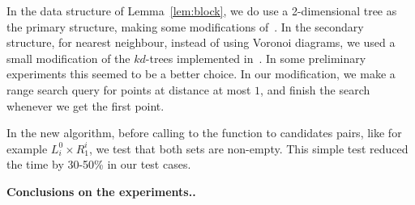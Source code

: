 \documentclass[a4paper,USenglish]{lipics}
\def\myparagraph#1{\medskip\noindent\textbf{#1.}}
\begin{document}
In the data structure of Lemma~\ref{lem:block},
we do use a 2-dimensional tree as the primary structure, making some modifications
of~\cite{cgal:n-rstd-15a}. In the secondary structure, for nearest neighbour, 
instead of using Voronoi diagrams, we used a small modification of
the $kd$-trees implemented in~\cite{cgal:tf-ssd-15a}. 
In some preliminary experiments this seemed to be a better choice.
In our modification, we make a range search query for points at distance at most $1$,
and finish the search whenever we get the first point.

In the new algorithm, before calling to the function to candidates pairs, like for example $L_i^0\times R^i_1$,
we test that both sets are non-empty. This simple test reduced the time by 30-50\%
in our test cases.



\myparagraph{Conclusions on the experiments.}




\end{document}
